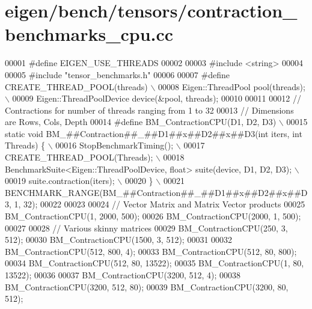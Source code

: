 \hypertarget{eigen_2bench_2tensors_2contraction__benchmarks__cpu_8cc_source}{}\section{eigen/bench/tensors/contraction\+\_\+benchmarks\+\_\+cpu.cc}
\label{eigen_2bench_2tensors_2contraction__benchmarks__cpu_8cc_source}

\begin{DoxyCode}
00001 \textcolor{preprocessor}{#define EIGEN\_USE\_THREADS}
00002 
00003 \textcolor{preprocessor}{#include <string>}
00004 
00005 \textcolor{preprocessor}{#include "tensor\_benchmarks.h"}
00006 
00007 \textcolor{preprocessor}{#define CREATE\_THREAD\_POOL(threads)             \(\backslash\)}
00008 \textcolor{preprocessor}{Eigen::ThreadPool pool(threads);                \(\backslash\)}
00009 \textcolor{preprocessor}{Eigen::ThreadPoolDevice device(&pool, threads);}
00010 
00011 
00012 \textcolor{comment}{// Contractions for number of threads ranging from 1 to 32}
00013 \textcolor{comment}{// Dimensions are Rows, Cols, Depth}
00014 \textcolor{preprocessor}{#define BM\_ContractionCPU(D1, D2, D3)                                         \(\backslash\)}
00015 \textcolor{preprocessor}{  static void BM\_##Contraction##\_##D1##x##D2##x##D3(int iters, int Threads) \{ \(\backslash\)}
00016 \textcolor{preprocessor}{    StopBenchmarkTiming();                                                    \(\backslash\)}
00017 \textcolor{preprocessor}{    CREATE\_THREAD\_POOL(Threads);                                              \(\backslash\)}
00018 \textcolor{preprocessor}{    BenchmarkSuite<Eigen::ThreadPoolDevice, float> suite(device, D1, D2, D3); \(\backslash\)}
00019 \textcolor{preprocessor}{    suite.contraction(iters);                                                 \(\backslash\)}
00020 \textcolor{preprocessor}{  \}                                                                           \(\backslash\)}
00021 \textcolor{preprocessor}{  BENCHMARK\_RANGE(BM\_##Contraction##\_##D1##x##D2##x##D3, 1, 32);}
00022 
00023 
00024 \textcolor{comment}{// Vector Matrix and Matrix Vector products}
00025 BM\_ContractionCPU(1, 2000, 500);
00026 BM\_ContractionCPU(2000, 1, 500);
00027 
00028 \textcolor{comment}{// Various skinny matrices}
00029 BM\_ContractionCPU(250, 3, 512);
00030 BM\_ContractionCPU(1500, 3, 512);
00031 
00032 BM\_ContractionCPU(512, 800, 4);
00033 BM\_ContractionCPU(512, 80, 800);
00034 BM\_ContractionCPU(512, 80, 13522);
00035 BM\_ContractionCPU(1, 80, 13522);
00036 
00037 BM\_ContractionCPU(3200, 512, 4);
00038 BM\_ContractionCPU(3200, 512, 80);
00039 BM\_ContractionCPU(3200, 80, 512);
\end{DoxyCode}
